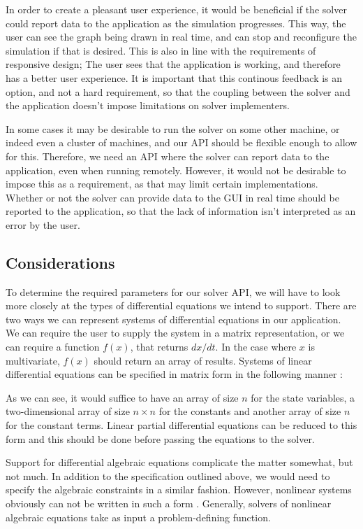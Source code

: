 \documentclass[\rootfolder/main.tex]{subfiles}
\begin{document}
In order to create a pleasant user experience, it would be beneficial if the solver could report data to the application as the simulation progresses.
This way, the user can see the graph being drawn in real time, and can stop and reconfigure the simulation if that is desired.
This is also in line with the requirements of responsive design; The user sees that the application is working, and therefore has a better user experience.
It is important that this continous feedback is an option, and not a hard requirement, so that the coupling between the solver and the application doesn't impose limitations on solver implementers.

In some cases it may be desirable to run the solver on some other machine, or indeed even a cluster of machines, and our API should be flexible enough to allow for this.
Therefore, we need an API where the solver can report data to the application, even when running remotely.
However, it would not be desirable to impose this as a requirement, as that may limit certain implementations.
Whether or not the solver can provide data to the GUI in real time should be reported to the application, so that the lack of information isn't interpreted as an error by the user.

\subsection{Considerations}

To determine the required parameters for our solver API, we will have to look more closely at the types of differential equations we intend to support.
There are two ways we can represent systems of differential equations in our application.
We can require the user to supply the system in a matrix representation, or we can require a function $f(x)$, that returns $dx/dt$.
In the case where $x$ is multivariate, $f(x)$ should return an array of results.
Systems of linear differential equations can be specified in matrix form in the following manner \cite{kreyzig}:


As we can see, it would suffice to have an array of size $n$ for the state variables,
a two-dimensional array of size $n \times n$ for the constants and another array of size $n$ for the constant terms.
Linear partial differential equations can be reduced to this form and this should be done before passing the equations to the solver.

Support for differential algebraic equations complicate the matter somewhat, but not much.
In addition to the specification outlined above, we would need to specify the algebraic constraints in a similar fashion.
However, nonlinear systems obviously can not be written in such a form \cite{khalil}.
Generally, solvers of nonlinear algebraic equations take as input a problem-defining function.
\end{document}
